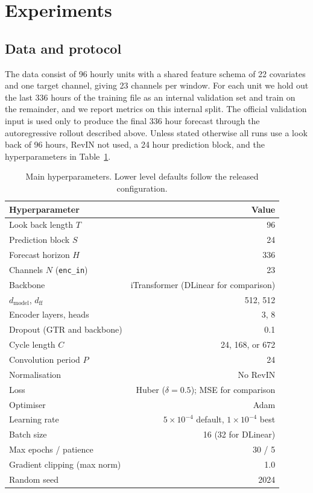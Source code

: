 \documentclass[11pt]{article}
\begin{document}
\section{Experiments}
\subsection{Data and protocol}
The data consist of 96 hourly units with a shared feature schema of 22 covariates and one target
channel, giving 23 channels per window. For each unit we hold out the last 336 hours of the
training file as an internal validation set and train on the remainder, and we report metrics on
this internal split. The official validation input is used only to produce the final 336 hour
forecast through the autoregressive rollout described above. Unless stated otherwise all runs use
a look back of 96 hours, RevIN not used, a 24 hour prediction block, and the hyperparameters in
Table~\ref{tab:hparams}.

\begin{table}[h]
\centering
\begin{tabular}{lr}
\toprule
Hyperparameter & Value \\
\midrule
Look back length $T$ & 96 \\
Prediction block $S$ & 24 \\
Forecast horizon $H$ & 336 \\
Channels $N$ (\texttt{enc\_in}) & 23 \\
Backbone & iTransformer (DLinear for comparison) \\
$d_{\text{model}}$, $d_{\text{ff}}$ & 512, 512 \\
Encoder layers, heads & 3, 8 \\
Dropout (GTR and backbone) & 0.1 \\
Cycle length $C$ & 24, 168, or 672 \\
Convolution period $P$ & 24 \\
Normalisation & No RevIN \\
Loss & Huber ($\delta=0.5$); MSE for comparison \\
Optimiser & Adam \\
Learning rate & $5\times10^{-4}$ default, $1\times10^{-4}$ best \\
Batch size & 16 (32 for DLinear) \\
Max epochs / patience & 30 / 5 \\
Gradient clipping (max norm) & 1.0 \\
Random seed & 2024 \\
\bottomrule
\end{tabular}
\caption{Main hyperparameters. Lower level defaults follow the released configuration.}
\label{tab:hparams}
\end{table}
\end{document}
